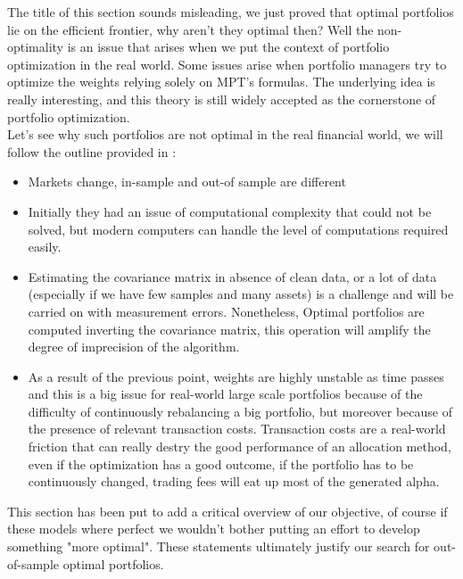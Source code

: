 The title of this section sounds misleading, we just proved that optimal portfolios lie on the efficient frontier, why aren't they optimal then? Well the non-optimality is an issue that arises when we put the context of portfolio optimization in the real world. Some issues arise when portfolio managers try to optimize the weights relying solely on MPT's formulas. The underlying idea is really interesting, and this theory is still widely accepted as the cornerstone of portfolio optimization.\\
Let's see why such portfolios are not optimal in the real financial world, we will follow the outline provided in \cite{Critica_Markowitz}:

\begin{itemize}
	\item Markets change, in-sample and out-of sample are different
	\item Initially they had an issue of computational complexity that could not be solved, but modern computers can handle the level of computations required easily.
	\item Estimating the covariance matrix in absence of clean data, or a lot of data (especially if we have few samples and many assets) is a challenge and will be carried on with measurement errors. Nonetheless, Optimal portfolios are computed inverting the covariance matrix, this operation will amplify the degree of imprecision of the algorithm.
	\item As a result of the previous point, weights are highly unstable as time passes and this is a big issue for real-world large scale portfolios because of the difficulty of continuously rebalancing a big portfolio, but moreover because of the presence of relevant transaction costs. Transaction costs are a real-world friction that can really destry the good performance of an allocation method, even if the optimization has a good outcome, if the portfolio has to be continuously changed, trading fees will eat up most of the generated alpha.
\end{itemize}

This section has been put to add a critical overview of our objective, of course if these models where perfect we wouldn't bother putting an effort to develop something "more optimal". These statements ultimately justify our search for out-of-sample optimal portfolios.